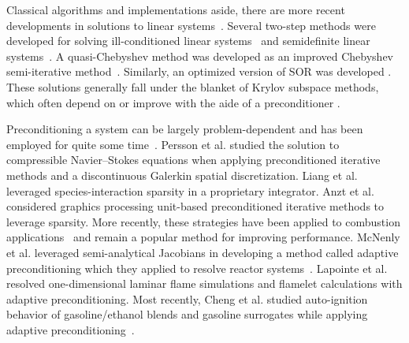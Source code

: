 \documentclass[12pt]{ussci}
\begin{document}
Classical algorithms and implementations aside, there are more recent developments in solutions to linear systems~\cite{tropp2010computational}.
Several two-step methods were developed for solving ill-conditioned linear systems~\cite{salkuyeh2011new, beik2018iterative} and semidefinite linear systems~\cite{salkuyeh2014iterative}.
A quasi-Chebyshev method was developed as an improved Chebyshev semi-iterative method~\cite{wen2013quasi}.
Similarly, an optimized version of SOR was developed \cite{meng2014practical}.
These solutions generally fall under the blanket of Krylov subspace methods, which often depend on or improve with the aide of a preconditioner \cite{benzi2002preconditioning, pearson2020preconditioners}.

Preconditioning a system can be largely problem-dependent and has been employed for quite some time~\cite{bramble1988preconditioning, trefethen1997numerical, chen2005matrix}.
Persson et al. studied the solution to compressible Navier--Stokes equations when applying preconditioned iterative methods and a discontinuous Galerkin spatial discretization\cite{persson_newton-gmres_2008}.
Liang et al.~\cite{liang_towards_2009} leveraged species-interaction sparsity in a proprietary integrator.
Anzt et al.~\cite{anzt_preconditioned_2017} considered graphics processing unit-based preconditioned iterative methods to leverage sparsity.
More recently, these strategies have been applied to combustion applications~\cite{marzouk_embedding_2012} and remain a popular method for improving performance.
McNenly et al. leveraged semi-analytical Jacobians in developing a method called adaptive preconditioning which they applied to resolve reactor systems~\cite{mcnenly_faster_2015}.
Lapointe et al.~\cite{lapointe_sparse_2019, lapointe_computationally-efficient_2020} resolved one-dimensional laminar flame simulations and flamelet calculations with adaptive preconditioning.
Most recently, Cheng et al. studied auto-ignition behavior of gasoline/ethanol blends and gasoline surrogates while applying adaptive preconditioning~\cite{cheng2020autoignition, cheng2021autoignition}.
\end{document}
